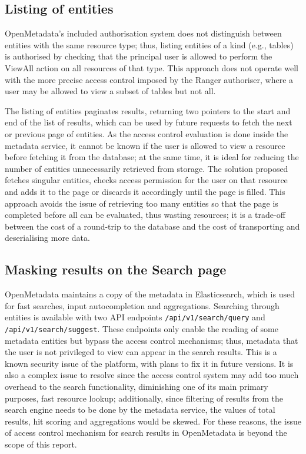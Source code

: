\subsection{Listing of entities}

OpenMetadata's included authorisation system does not distinguish between entities with the same resource type; thus, listing entities of a kind (e.g., tables) is authorised by checking that the principal user is allowed to perform the ViewAll action on all resources of that type. This approach does not operate well with the more precise access control imposed by the Ranger authoriser, where a user may be allowed to view a subset of tables but not all.

The listing of entities paginates results, returning two pointers to the start and end of the list of results, which can be used by future requests to fetch the next or previous page of entities. As the access control evaluation is done inside the metadata service, it cannot be known if the user is allowed to view a resource before fetching it from the database; at the same time, it is ideal for reducing the number of entities unnecessarily retrieved from storage. The solution proposed fetches singular entities, checks access permission for the user on that resource and adds it to the page or discards it accordingly until the page is filled. This approach avoids the issue of retrieving too many entities so that the page is completed before all can be evaluated, thus wasting resources; it is a trade-off between the cost of a round-trip to the database and the cost of transporting and deserialising more data. 

\subsection{\label{sec:masking_results_from_search} Masking results on the Search page}

OpenMetadata maintains a copy of the metadata in Elasticsearch, which is used for fast searches, input autocompletion and aggregations. Searching through entities is available with two API endpoints  \texttt{/api/v1/search/query} and \texttt{/api/v1/search/suggest}. These endpoints only enable the reading of some metadata entities but bypass the access control mechanisms; thus, metadata that the user is not privileged to view can appear in the search results. This is a known security issue of the platform, with plans to fix it in future versions. It is also a complex issue to resolve since the access control system may add too much overhead to the search functionality, diminishing one of its main primary purposes, fast resource lookup; additionally, since filtering of results from the search engine needs to be done by the metadata service, the values of total results, hit scoring and aggregations would be skewed. For these reasons, the issue of access control mechanism for search results in OpenMetadata is beyond the scope of this report.

